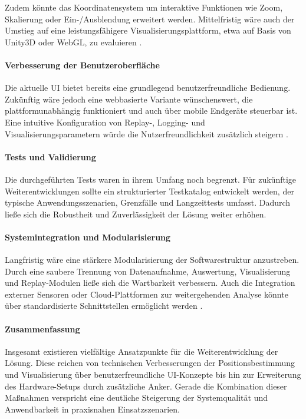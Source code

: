 \documentclass[a4paper, 12pt]{article} %
\begin{document}
Zudem könnte das Koordinatensystem um interaktive Funktionen wie Zoom, Skalierung oder Ein-/Ausblendung erweitert werden. Mittelfristig wäre auch 
der Umstieg auf eine leistungsfähigere Visualisierungsplattform, etwa auf Basis von Unity3D oder WebGL, zu evaluieren \cite{buyuksalih20173d}.

\paragraph{Verbesserung der Benutzeroberfläche}
Die aktuelle \ac{UI} bietet bereits eine grundlegend benutzerfreundliche Bedienung. Zukünftig wäre jedoch eine webbasierte Variante wünschenswert, 
die plattformunabhängig funktioniert und auch über mobile Endgeräte steuerbar ist. Eine intuitive Konfiguration von Replay-, Logging- und 
Visualisierungsparametern würde die Nutzerfreundlichkeit zusätzlich steigern \cite{ux_design_book}.

\paragraph{Tests und Validierung}
Die durchgeführten Tests waren in ihrem Umfang noch begrenzt. Für zukünftige Weiterentwicklungen sollte ein strukturierter Testkatalog 
entwickelt werden, der typische Anwendungsszenarien, Grenzfälle und Langzeittests umfasst. Dadurch ließe sich die Robustheit und Zuverlässigkeit 
der Lösung weiter erhöhen.

\paragraph{Systemintegration und Modularisierung}
Langfristig wäre eine stärkere Modularisierung der Softwarestruktur anzustreben. Durch eine saubere Trennung von Datenaufnahme, Auswertung, 
Visualisierung und Replay-Modulen ließe sich die Wartbarkeit verbessern. Auch die Integration externer Sensoren oder Cloud-Plattformen zur 
weitergehenden Analyse könnte über standardisierte Schnittstellen ermöglicht werden \cite{software_architecture_modular}.

\paragraph{Zusammenfassung}
Insgesamt existieren vielfältige Ansatzpunkte für die Weiterentwicklung der Lösung. Diese reichen von technischen Verbesserungen der 
Positionsbestimmung und Visualisierung über benutzerfreundliche \ac{UI}-Konzepte bis hin zur Erweiterung des Hardware-Setups durch zusätzliche Anker. 
Gerade die Kombination dieser Maßnahmen verspricht eine deutliche Steigerung der Systemqualität und Anwendbarkeit in praxisnahen Einsatzszenarien.

\clearpage

\begingroup
\sloppy
\nocite{*}
\printbibliography
\end{document}
